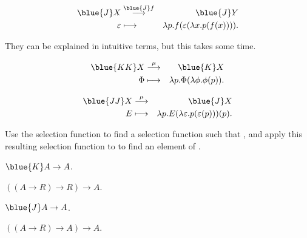 \documentclass%
[%
Screen4to3,
]{foils}
\begin{document}
\begin{eqnarray*}
  \blue{J} X & \stackrel{\blue{J} f}{\longrightarrow} & \blue{J} Y \\
  \varepsilon & \longmapsto & \lambda p.f(\varepsilon(\lambda x. p(f(x)))).
\end{eqnarray*}



They can be explained in intuitive terms, but this takes some time.

\begin{eqnarray*}
  \blue{K K} X & \stackrel{\mu}{\longrightarrow} & \blue{K} X \\
  \Phi & \longmapsto &  \lambda p.\Phi(\lambda \phi.\phi(p)).
\end{eqnarray*}

\begin{eqnarray*}
  \blue{J J} X & \stackrel{\mu}{\longrightarrow} & \blue{J} X \\
  E & \longmapsto &  \lambda p.E(\lambda \varepsilon.p(\varepsilon(p)))(p).
\end{eqnarray*}
\vfill

Use the selection function  to find a selection function
\darkblue{$\varepsilon$} such that , and
apply this resulting selection function to  to find an
element of .




$\blue{K} A \to A$. 

\qquad $((A \to R) \to R) \to A$.

\qquad  {}


\vfill

$\blue{J} A \to A$. 

\qquad $((A \to R) \to A) \to A$.

\qquad {}

\vfill


\end{document}
